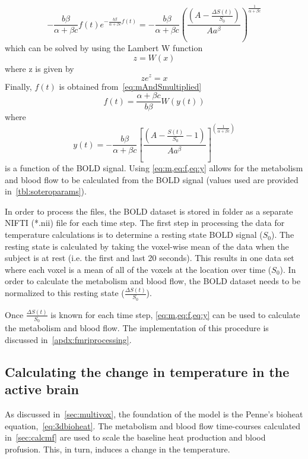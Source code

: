     \begin{equation} \label{eq:mAndSmultiplied}
      -\frac{b\beta}{\alpha+\beta c} f(t)e^{-\frac{b \beta}{\alpha + \beta c}f(t)}=-\frac{b\beta}{\alpha+\beta c} \left(\frac{\left(A-\frac{\Delta S(t)}{S_0}\right)}{A a^\beta}\right)^{\frac{1}{\alpha+\beta c}}
    \end{equation}
  which can be solved by using the Lambert W function
    \begin{equation} \label{eq:lambertW}
      z=W(x)
    \end{equation}
  where z is given by
    \begin{equation} \label{eq:lambertWsetup}
      z e^z = x
    \end{equation}
  Finally, $f(t)$ is obtained from~\cref{eq:mAndSmultiplied}
    \begin{equation} \label{eq:f}
      f(t)=\frac{\alpha+\beta c}{b \beta}W(y(t))
    \end{equation}
  where
    \begin{equation} \label{eq:y} 
    	y(t)=-\frac{b \beta}{\alpha+\beta c} \left[\frac{(A-\frac{S(t)}{S_{0}}-1)}{A a^{\beta}}\right]^{\left(\frac{1}{\alpha+\beta c}\right)} 
    \end{equation}
  is a function of the BOLD signal.  Using \cref{eq:m,eq:f,eq:y} allows for the metabolism and blood flow to be calculated from the BOLD signal (values used are provided in~\cref{tbl:soteroparams}).
  
    In order to process the files, the BOLD dataset is stored in folder as a separate NIFTI (*.nii) file for each time step.  The first step in processing the data for temperature calculations is to determine a resting state BOLD signal ($S_0$).  The resting state is calculated by taking the voxel-wise mean of the data when the subject is at rest (i.e. the first and last 20 seconds).  This results in one data set where each voxel is a mean of all of the voxels at the location over time ($S_0$).  In order to calculate the metabolism and blood flow, the BOLD dataset needs to be normalized to this resting state ($\frac{\Delta S(t)}{S_0}$).  
    
    Once $\frac{\Delta S(t)}{S_0}$ is known for each time step, \cref{eq:m,eq:f,eq:y} can be used to calculate the metabolism and blood flow. The implementation of this procedure is discussed in~\cref{apdx:fmriprocessing}. 

    \subsection{\label{sec:calcT} Calculating the change in temperature in the active brain}
    As discussed in~\cref{sec:multivox}, the foundation of the model is the Penne's bioheat equation,~\cref{eq:3dbioheat}.  The metabolism and blood flow time-courses calculated in~\cref{sec:calcmf} are used to scale the baseline heat production and blood profusion.  This, in turn, induces a change in the temperature.
    
